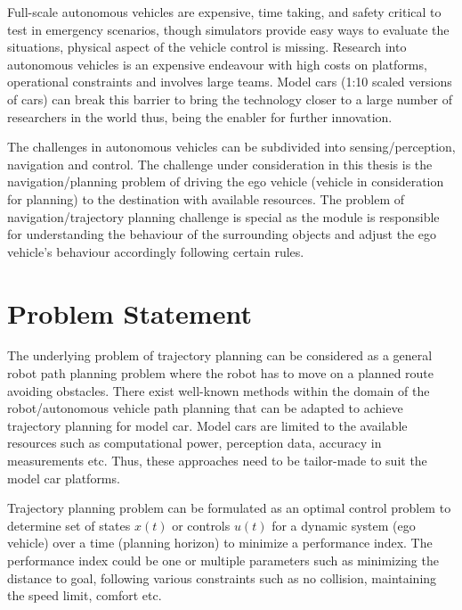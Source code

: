 Full-scale autonomous vehicles are expensive, time taking, and safety critical to test in emergency scenarios, though simulators provide easy ways to evaluate the situations, physical aspect of the vehicle control is missing. Research into autonomous vehicles is an expensive endeavour with high costs on platforms, operational constraints and involves large teams. Model cars (1:10 scaled versions of cars) can break this barrier to bring the technology closer to a large number of researchers in the world thus, being the enabler for further innovation.

The challenges in autonomous vehicles can be subdivided into sensing/perception, navigation and control. The challenge under consideration in this thesis is the navigation/planning problem of driving the ego vehicle (vehicle in consideration for planning) to the destination with available resources. The problem of navigation/trajectory planning challenge is special as the module is responsible for understanding the behaviour of the surrounding objects and adjust the ego vehicle's behaviour accordingly following certain rules.

\section{Problem Statement}

The underlying problem of trajectory planning can be considered as a general robot path planning problem where the robot has to move on a planned route avoiding obstacles. There exist well-known methods within the domain of the robot/autonomous vehicle path planning that can be adapted to achieve trajectory planning for model car. Model cars are limited to the available resources such as computational power, perception data, accuracy in measurements etc. Thus, these approaches need to be tailor-made to suit the model car platforms.

Trajectory planning problem can be formulated as an optimal control problem to determine set of states $x(t)$ or controls $u(t)$ for a dynamic system (ego vehicle) over a time (planning horizon) to minimize a performance index. The performance index could be one or multiple parameters such as minimizing the distance to goal, following various constraints such as no collision, maintaining the speed limit, comfort etc.


